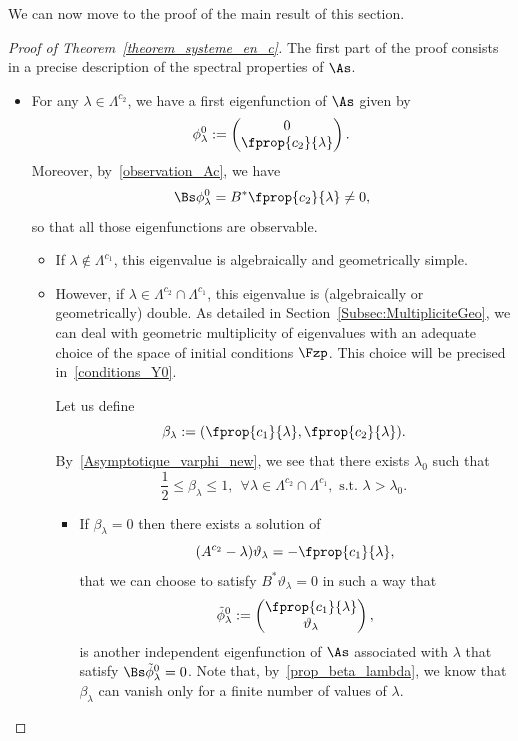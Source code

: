We can now move to the proof of the main result of this section.
\begin{proof}[Proof of Theorem~\ref{theorem_systeme_en_c}]
The first part of the proof consists in a precise description of the spectral properties of $\As$.
\begin{itemize}
\item For any $\lambda\in \Lambda^{c_2}$, we have a first eigenfunction of $\As$ given by
\begin{equation}\label{systeme_en_c_fp1}
\phi_{\lambda}^0 :=
\begin{pmatrix} 
0 \\ \fprop{c_2}{\lambda}
\end{pmatrix}.
\end{equation}
Moreover, by~\eqref{observation_Ac}, we have
\[
\Bs \phi_{\lambda}^0= B^*\fprop{c_2}{\lambda} \neq 0,
\]
so that all those eigenfunctions are observable.
\begin{itemize}
\item If $\lambda\not\in \Lambda^{c_1}$, this eigenvalue is algebraically and geometrically simple.
\item However, if $\lambda\in \Lambda^{c_2}\cap \Lambda^{c_1}$, this eigenvalue is (algebraically or geometrically) double. As detailed in Section~\ref{Subsec:MultipliciteGeo}, we can deal with geometric multiplicity of eigenvalues with an adequate choice of the space of initial conditions $\Fzp$. This choice will be precised in~\eqref{conditions_Y0}.

Let us define
\begin{equation}\label{def_beta_lambda}
\beta_\lambda:=(\fprop{c_1}{\lambda},\fprop{c_2}{\lambda}).
\end{equation}
By~\eqref{Asymptotique_varphi_new}, we see that there exists $\lambda_0$ such that
\begin{equation}\label{prop_beta_lambda}
\frac{1}{2} \leq \beta_\lambda\leq 1, \ \ \forall \lambda\in \Lambda^{c_2}\cap \Lambda^{c_1}, \text{ s.t. } \lambda>\lambda_0.
\end{equation}
\begin{itemize}
\item If $\beta_\lambda=0$ then there exists a solution of
\[
(A^{c_2}-\lambda) \vartheta_\lambda = - \fprop{c_1}{\lambda},
\]
that we can choose to satisfy $B^* \vartheta_\lambda=0$ in such a way that
\[
\tilde{\phi}_\lambda^0:=
\begin{pmatrix} \fprop{c_1}{\lambda} \\ \vartheta_\lambda
\end{pmatrix},
\]
is another independent eigenfunction of $\As$ associated with $\lambda$ that satisfy $\Bs \tilde{\phi}^0_\lambda=0$. Note that, by~\eqref{prop_beta_lambda}, we know that $\beta_\lambda$ can vanish only for a finite number of values of $\lambda$.


\end{itemize}
\end{itemize}
\end{itemize}
\end{proof}
